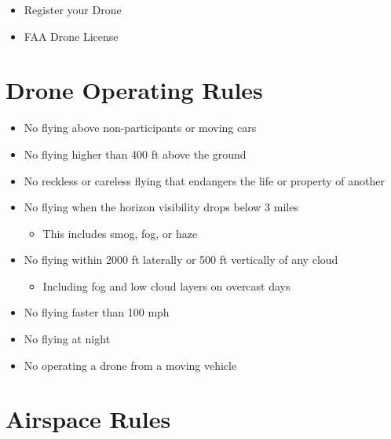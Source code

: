 \documentclass[
]{book}
\providecommand{\tightlist}{%
  \setlength{\itemsep}{0pt}\setlength{\parskip}{0pt}}
\begin{document}
\begin{itemize}
\tightlist
\item
  \protect\hypertarget{ch-registration}{}{Register your Drone}
\item
  \protect\hypertarget{ch-license}{}{FAA Drone License}
\end{itemize}

\hypertarget{drone-operating-rules}{%
\section{Drone Operating Rules}\label{drone-operating-rules}}

\begin{itemize}
\tightlist
\item
  No flying above non-participants or moving cars
\item
  No flying higher than 400 ft above the ground
\item
  No reckless or careless flying that endangers the life or property of another
\item
  No flying when the horizon visibility drops below 3 miles

  \begin{itemize}
  \tightlist
  \item
    This includes smog, fog, or haze
  \end{itemize}
\item
  No flying within 2000 ft laterally or 500 ft vertically of any cloud

  \begin{itemize}
  \tightlist
  \item
    Including fog and low cloud layers on overcast days
  \end{itemize}
\item
  No flying faster than 100 mph
\item
  No flying at night
\item
  No operating a drone from a moving vehicle
\end{itemize}

\hypertarget{airspace-rules}{%
\section{Airspace Rules}\label{airspace-rules}}
\end{document}
